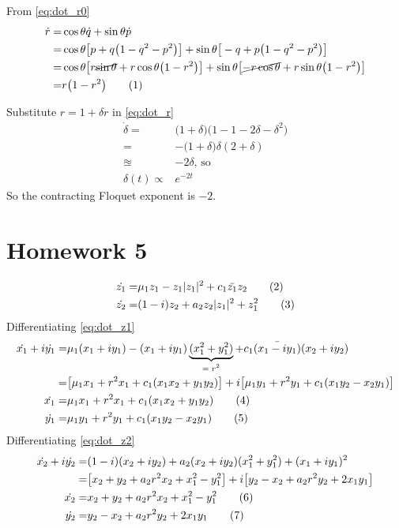 \documentclass[]{article}
\newcommand\numberthis{\addtocounter{equation}{1}\tag{\theequation}}
\begin{document}
From \eqref{eq:dot_r0}
\begin{align*}
	\dot{r} =&	\cos{\theta} \dot{q} + \sin{\theta} \dot{p}\\
	=& 	\cos{\theta} \big[p + q\big(1-q^2-p^2\big)\big] + \sin{\theta} \big[-q + p\big(1-q^2-p^2\big)\big]\\
	=& 	\cos{\theta} \big[r \cancel{\sin{\theta}} + r \cos{\theta}\big(1-r^2\big)\big] + \sin{\theta} \big[\cancel{-r \cos{\theta}} + r \sin{\theta}\big(1-r^2\big)\big]\\
	=& r \big(1-r^2\big) \numberthis \label{eq:dot_r}
\end{align*}

Substitute $r=1+\delta r$ in \eqref{eq:dot_r}
\begin{align*}
	\dot{\delta} =& \big(1+\delta\big)\big(1 -1 -2 \delta - \delta^2\big)\\
	=& - \big(1+\delta\big) \delta (2 + \delta)\\
	\approxeq & - 2 \delta \text{, so}\\
	\delta(t) \propto & e^{-2 t}
\end{align*}
So the contracting Floquet exponent is $-2$.

\section{Homework 5}

\begin{align*}
	\dot{z_1} =& \mu_1 z_1 - z_1 \vert z_1 \vert^2 + c_1 \bar{z_1} z_2  \numberthis \label{eq:dot_z1}\\
	\dot{z_2} =& (1-i)z_2 + a_2z_2 \vert z_1 \vert^2+z_1^2  \numberthis \label{eq:dot_z2}
\end{align*}
Differentiating \eqref{eq:dot_z1}
\begin{align*}
	\dot{x_1} + i\dot{y_1}=& \mu_1(x_1+i y_1) - (x_1+i y_1)  \underbrace{(x_1^2+ y_1^2)}_\text{$= r^2$}  + c_1 \bar{(x_1-i y_1)} (x_2+i y_2)\\
	=& \big[\mu_1 x_1 + r^2 x_1 +c_1(x_1x_2+y_1y_2)\big]+ i\big[\mu_1y_1 + r^2 y_1 +c_1(x_1y_2-x_2y_1)\big]\\
	\dot{x_1} =&\mu_1 x_1 + r^2 x_1 +c_1(x_1x_2+y_1y_2)  \numberthis \label{eq:dot_x1}\\
	\dot{y_1}=& \mu_1y_1 + r^2 y_1 +c_1(x_1y_2-x_2y_1)  \numberthis \label{eq:dot_y1}
\end{align*}
Differentiating \eqref{eq:dot_z2}
\begin{align*}
	\dot{x_2} + i\dot{y_2} =& (1-i)(x_2+i y_2) + a_2(x_2+i y_2) (x_1^2+ y_1^2)+(x_1+i y_1)^2\\
	=& \big[x_2+y_2 + a_2 r^2 x_2 +x_1^2-y_1^2\big] + i\big[y_2-x_2+a_2 r^2 y_2 + 2 x_1y_1\big]\\
	\dot{x_2} =&x_2+y_2 + a_2 r^2 x_2 +x_1^2-y_1^2 \numberthis \label{eq:dot_x2}\\
	\dot{y_2}=& y_2-x_2+a_2 r^2 y_2 + 2 x_1y_1  \numberthis \label{eq:dot_y2}
\end{align*}
\end{document}
